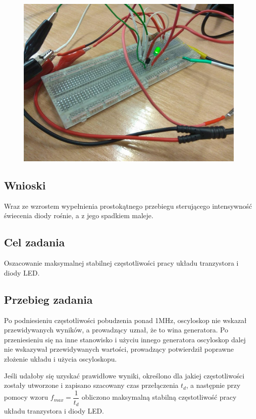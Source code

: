 \documentclass[polish,polish,a4paper]{article}
\begin{document}
\begin{figure}[H]
	\centering
	\includegraphics[scale=0.3]{diodadladuzego.jpg}
\end{figure}

\subsection{Wnioski}

Wraz ze wzrostem wypełnienia prostokątnego przebiegu sterującego intensywność świecenia diody rośnie, a z jego spadkiem maleje.

\subsection{Cel zadania}
Oszacowanie maksymalnej stabilnej częstotliwości pracy układu tranzystora i diody LED.

\subsection{Przebieg zadania}

Po podniesieniu częstotliwości pobudzenia ponad 1MHz, oscyloskop nie wskazał przewidywanych wyników, a prowadzący uznał, że to wina generatora. Po przeniesieniu się na inne stanowisko i użyciu innego generatora oscyloskop dalej nie wskazywał przewidywanych wartości, prowadzący potwierdził poprawne złożenie układu i użycia oscyloskopu.


Jeśli udałoby się uzyskać prawidłowe wyniki, określono dla jakiej częstotliwości zostały utworzone i zapisano szacowany czas przełączenia $t_{d}$, a następnie przy pomocy wzoru $f_{max} = \dfrac{1}{t_{d}}$ obliczono maksymalną stabilną częstotliwość pracy układu tranzystora i diody LED.
\end{document}
